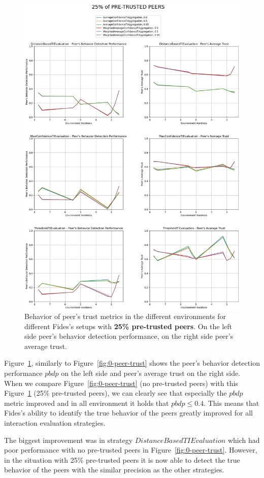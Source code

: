 \begin{figure}[hp]
    \centering
    \includegraphics[width=1.0\textwidth]{assets/25_peer_trust.png}
    \caption{Behavior of peer's trust metrics in the different environments for different Fides's setups with \textbf{25\% pre-trusted peers}. On the left side peer's behavior detection performance, on the right side peer's average trust.}
    \label{fig:25-peer-trust}
\end{figure}

Figure~\ref{fig:25-peer-trust}, similarly to Figure~\ref{fig:0-peer-trust} shows the peer's behavior detection performance $pbdp$ on the left side and peer's average trust on the right side.
When we compare Figure~\ref{fig:0-peer-trust} (no pre-trusted peers) with this Figure~\ref{fig:25-peer-trust} (25\% pre-trusted peers), we can clearly see that especially the $pbdp$ metric improved and in all environment it holds that $pbdp \leq 0.4$. 
This means that Fides's ability to identify the true behavior of the peers greatly improved for all interaction evaluation strategies.

The biggest improvement was in strategy $DistanceBasedTIEvaluation$ which had poor performance with no pre-trusted peers in Figure~\ref{fig:0-peer-trust}. However, in the situation with 25\% pre-trusted peers it is now able to detect the true behavior of the peers with the similar precision as the other strategies.
